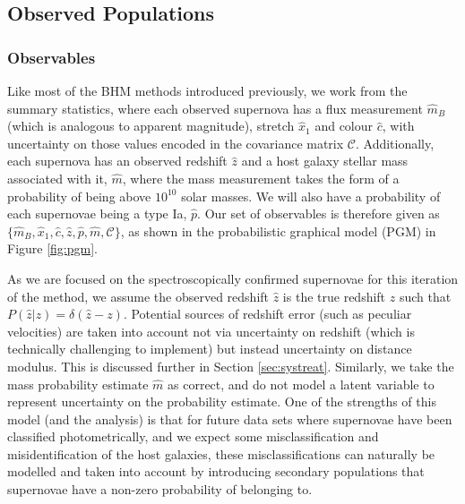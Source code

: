 \documentclass[a4paper,fleqn,usenatbib]{mnras}
\newcommand{\green}{\color{forestgreen}}
\newcommand{\cov}{\mathcal{C}}
\newcommand{\rubin}{\citetalias{Rubin2015}}
\begin{document}
\subsection{Observed Populations}

\subsubsection{Observables}
Like most of the BHM methods introduced previously, we work from the summary statistics, where each observed supernova has a flux measurement $\hat{m}_B$ (which is analogous to apparent magnitude), stretch $\hat{x}_1$ and colour $\hat{c}$, with uncertainty on those values encoded in the covariance matrix $\cov$. Additionally, each supernova has an observed redshift $\hat{z}$ and a host galaxy {\green stellar }mass associated with it, $\hat{m}$, where the mass measurement takes the form of a probability of being above $10^{10}$ solar masses. We will also have a probability of each supernovae being a type Ia, $\hat{p}$. Our set of observables is therefore given as $\lbrace \hat{m}_B, \hat{x}_1, \hat{c}, \hat{z}, \hat{p}, \hat{m}, \cov \rbrace$, as shown in the probabilistic graphical model (PGM) in Figure \ref{fig:pgm}.


As we are focused on the spectroscopically confirmed supernovae for this iteration of the method, we assume the observed redshift $\hat{z}$ is the true redshift $z$ such that $P(\hat{z}|z) = \delta(\hat{z} - z)$. Potential sources of redshift error (such as peculiar velocities) are taken into account not via uncertainty on redshift (which is technically challenging to implement) but instead uncertainty on distance modulus. This is discussed further in Section \ref{sec:systreat}. Similarly, we take the mass probability estimate $\hat{m}$ as correct, and do not model a latent variable to represent uncertainty on the probability estimate. One of the strengths of this model (and the {\rubin} analysis) is that for future data sets where supernovae have been classified photometrically, and we expect some misclassification and misidentification of the host galaxies, {\green these misclassifications} can naturally be modelled and taken into account by introducing secondary populations that supernovae have a non-zero probability of belonging to.
\end{document}
